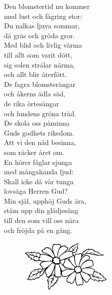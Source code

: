 \documentclass[a6paper, 10pt, twoside]{article}
\begin{document}
\noindent
\begin{center}
\end{center}
\begin{lyrics}
Den blomstertid nu kommer\\
med lust och fägring stor:\\
Du nalkas ljuva sommar,\\
då gräs och gröda gror.\\
Med blid och livlig värma\\
till allt som varit dött,\\
sig solen strålar närma,\\
och allt blir återfött.
\vspace{5pt}\\
De fagra blomsterängar\\
och åkerns ädla säd,\\
de rika örtesängar\\
och lundens gröna träd.\\
De skola oss påminna\\
Guds godhets rikedom.\\
Att vi den nåd besinna,\\
som räcker året om.
\vspace{5pt}\\
En hörer fåglar sjunga\\
med mångahanda ljud:\\
Skall icke då vår tunga\\
lovsäga Herren Gud?\\
Min själ, upphöj Guds ära,\\
stäm upp din glädjesång\\
till den som vill oss nära\\
och fröjda på en gång.
\end{lyrics} 
\vspace{-10pt}
\begin{figure}[!h]
\hspace{30pt}\includegraphics[width=0.4\textwidth]{blommor.png}
\end{figure}
\end{document}
